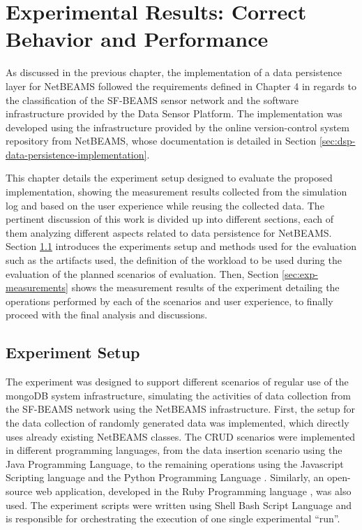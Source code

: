 

\chapter{Experimental Results: Correct Behavior and Performance}

As discussed in the previous chapter, the implementation of a data persistence
layer for NetBEAMS followed the requirements defined in Chapter 4 in regards
to the classification of the SF-BEAMS sensor network and the software
infrastructure provided by the Data Sensor Platform. The implementation was
developed using the infrastructure provided by the online version-control
system repository from NetBEAMS, whose documentation is detailed in Section
\ref{sec:dsp-data-persistence-implementation}.

This chapter details the experiment setup designed to evaluate the proposed
implementation, showing the measurement results collected from the simulation
log and based on the user experience while reusing the collected data. The
pertinent discussion of this work is divided up into different sections, each
of them analyzing different aspects related to data persistence for NetBEAMS.
Section \ref{sec:exp-setup} introduces the experiments setup and methods used
for the evaluation such as the artifacts used, the definition of the workload
to be used during the evaluation of the planned scenarios of evaluation. Then,
Section \ref{sec:exp-measurements} shows the measurement results of the
experiment detailing the operations performed by each of the scenarios and
user experience, to finally proceed with the final analysis and discussions.

\section{Experiment Setup}
\label{sec:exp-setup}

The experiment was designed to support different scenarios of regular use of
the mongoDB system infrastructure, simulating the activities of data collection
from the SF-BEAMS network using the NetBEAMS infrastructure. First, the setup
for the data collection of randomly generated data was implemented, which
directly uses already existing NetBEAMS classes. The CRUD scenarios were
implemented in different programming languages, from the data insertion
scenario using the Java Programming Language, to the remaining operations using
the Javascript Scripting language \cite{javascript} and the Python Programming
Language \cite{python}. Similarly, an open-source web application, developed
in the Ruby Programming language \cite{ruby}, was also used. The experiment
scripts were written using Shell Bash Script Language \cite{bashshell} and is
responsible for orchestrating the execution of one single experimental ``run''.

